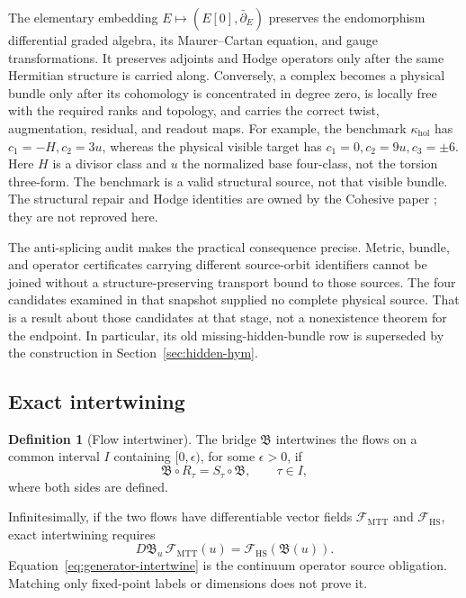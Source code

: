 \documentclass[11pt]{article}
\theoremstyle{definition}
\newtheorem{definition}[theorem]{Definition}
\theoremstyle{remark}
\newcommand{\cF}{\mathcal F}
\begin{document}
The elementary embedding \(E\mapsto(E[0],\bar\partial_E)\) preserves the
endomorphism differential graded algebra, its Maurer--Cartan equation, and
gauge transformations.  It preserves adjoints and Hodge operators only after
the same Hermitian structure is carried along.  Conversely, a complex becomes
a physical bundle only after its cohomology is concentrated in degree zero,
is locally free with the required ranks and topology, and carries the correct
twist, augmentation, residual, and readout maps.  For example, the benchmark
\(\kappa_{\mathrm{hol}}\) has \(c_1=-H,c_2=3u\), whereas the physical visible
target has \(c_1=0,c_2=9u,c_3=\pm6\).  Here \(H\) is a divisor class and
\(u\) the normalized base four-class, not the torsion three-form.  The
benchmark is a valid structural source, not that visible bundle.  The
structural repair and Hodge identities are owned by the Cohesive paper
\cite{NeroCohesive2026}; they are not reproved here.

The anti-splicing audit \cite{FRG3A} makes the practical consequence precise.
Metric, bundle, and operator certificates carrying different source-orbit
identifiers cannot be joined without a structure-preserving transport bound
to those sources.  The four candidates examined in that snapshot supplied
no complete physical source.  That is a result about those candidates at
that stage, not a nonexistence theorem for the endpoint.  In particular, its
old missing-hidden-bundle row is superseded by the construction in
Section~\ref{sec:hidden-hym}.

\subsection{Exact intertwining}

\begin{definition}[Flow intertwiner]
\label{def:intertwiner}
The bridge \(\mathfrak B\) intertwines the flows on a common interval \(I\)
containing \([0,\epsilon)\), for some \(\epsilon>0\), if
\begin{equation}
\mathfrak B\circ R_\tau=S_\tau\circ\mathfrak B,
\qquad \tau\in I,
\label{eq:intertwine}
\end{equation}
where both sides are defined.
\end{definition}

Infinitesimally, if the two flows have differentiable vector fields
\(\cF_{\mathrm{MTT}}\) and \(\cF_{\mathrm{HS}}\), exact intertwining requires
\begin{equation}
D\mathfrak B_u\,\cF_{\mathrm{MTT}}(u)
=\cF_{\mathrm{HS}}(\mathfrak B(u)).
\label{eq:generator-intertwine}
\end{equation}
Equation~\eqref{eq:generator-intertwine} is the continuum operator source
obligation.  Matching only fixed-point labels or dimensions does not prove it.
\end{document}
